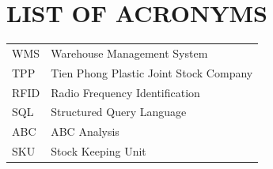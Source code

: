 \thispagestyle{empty}
    \cleardoublepage

\tableofcontents 
    \thispagestyle{empty}
        \newpage
            \thispagestyle{empty}
                \cleardoublepage

\section*{LIST OF ACRONYMS}
     {}

\begin{tabular}{ l l }
    \hspace{1cm} WMS & \hspace{2cm} Warehouse Management System    \\
    \hspace{1cm} TPP & \hspace{2cm} Tien Phong Plastic Joint Stock Company \\
    \hspace{1cm} RFID & \hspace{2cm} Radio Frequency Identification \\
    \hspace{1cm} SQL & \hspace{2cm} Structured Query Language \\
    \hspace{1cm} ABC  & \hspace{2cm} ABC Analysis \\
    \hspace{1cm} SKU  & \hspace{2cm} Stock Keeping Unit \\
\end{tabular}  
    \newpage

{\let\oldnumberline\numberline
    \renewcommand{\numberline}{Figure~\oldnumberline}
        \listoffigures}
\newpage

{\let\oldnumberline\numberline
    \renewcommand{\numberline}{Table~\oldnumberline}
        \listoftables}
\newpage

